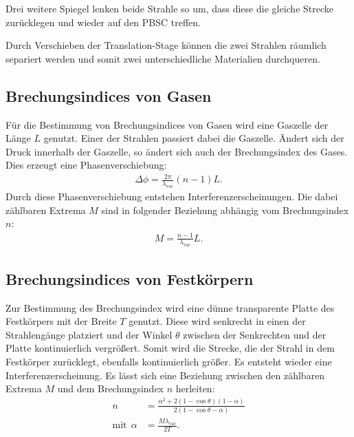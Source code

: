 Drei weitere Spiegel lenken beide Strahle so um, dass diese die gleiche Strecke zurücklegen und wieder auf
den PBSC treffen.

Durch Verschieben der Translation-Stage können die zwei Strahlen räumlich separiert
werden und somit zwei unterschiedliche Materialien durchqueren.

\FloatBarrier

\subsection{Brechungsindices von Gasen}
Für die Bestimmung von Brechungsindices von Gasen wird eine Gaszelle
der Länge $L$ genutzt. Einer der Strahlen passiert dabei die Gaszelle.
Ändert sich der Druck innerhalb der Gaszelle, so ändert sich auch
der Brechungsindex des Gases. Dies erzeugt eine Phasenverschiebung:
\begin{align}
  \Delta\phi=\frac{2\pi}{\lambda_\mathrm{vac}}(n-1)L.
\end{align}
Durch diese Phasenverschiebung entstehen Interferenzerscheinungen.
Die dabei zählbaren Extrema $M$ sind in folgender Beziehung abhängig
vom Brechungsindex $n$:
\begin{align}
  M=\frac{n-1}{\lambda_\mathrm{vac}}L\label{eqn:gas}.
\end{align}

\subsection{Brechungsindices von Festkörpern}
Zur Bestimmung des Brechungsindex wird eine dünne transparente
Platte des Festkörpers mit der Breite $T$ genutzt. Diese wird senkrecht in einen der Strahlengänge
platziert und der Winkel $\theta$ zwischen der Senkrechten und der Platte kontinuierlich vergrößert. Somit wird die
Strecke, die der Strahl in dem Festkörper zurücklegt, ebenfalls kontinuierlich größer.
Es entsteht wieder eine Interferenzerscheinung.
Es lässt sich eine Beziehung zwischen den zählbaren Extrema $M$
und dem Brechungsindex $n$ herleiten:
\begin{align}%
  n&=\frac{\alpha^2+2(1-\cos\theta)(1-\alpha)}{2(1-\cos\theta-\alpha)}\\
  \text{mit} \ \ \alpha&= \frac{M\lambda_\mathrm{vac}}{2T}. \label{eqn:glas}
\end{align}
